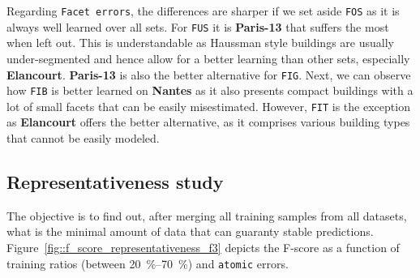         Regarding \texttt{Facet errors}, the differences are sharper if we set aside \texttt{FOS} as it is always well learned over all sets.
        For \texttt{FUS} it is \textbf{Paris-13} that suffers the most when left out.
        This is understandable as Haussman style buildings are usually under-segmented and hence allow for a better learning than other sets, especially \textbf{Elancourt}.
        \textbf{Paris-13} is also the better alternative for \texttt{FIG}.
        Next, we can observe how \texttt{FIB} is better learned on \textbf{Nantes} as it also presents compact buildings with a lot of small facets that can be easily misestimated.
        However, \texttt{FIT} is the exception as \textbf{Elancourt} offers the better alternative, as it comprises various building types that cannot be easily modeled.
    
    \subsection{Representativeness study}
        \label{subsec::experiments::scalability::representativeness}
        The objective is to find out, after merging all training samples from all datasets, what is the minimal amount of data that can guaranty stable predictions.
        Figure~\ref{fig::f_score_representativeness_f3} depicts the F-score as a function of training ratios (between \SIrange[range-phrase={ and }]{20}{70}{\percent}) and \texttt{atomic} errors.\\
                
        \begin{figure}[htbp]
        \end{figure}
            
